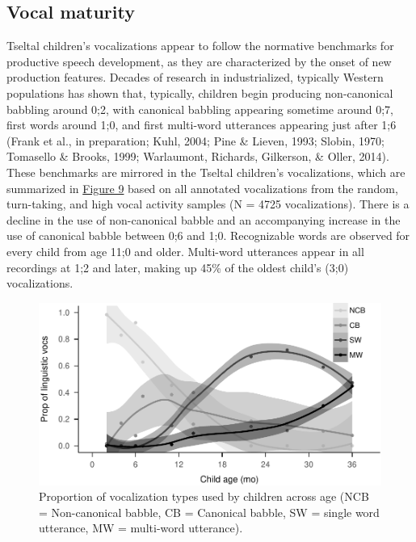 \documentclass[floatsintext,man]{apa6}
\theoremstyle{definition}
\theoremstyle{definition}
\theoremstyle{definition}
\theoremstyle{remark}
\begin{document}
\subsection{Vocal maturity}\label{vocal-maturity}

Tseltal children's vocalizations appear to follow the normative
benchmarks for productive speech development, as they are characterized
by the onset of new production features. Decades of research in
industrialized, typically Western populations has shown that, typically,
children begin producing non-canonical babbling around 0;2, with
canonical babbling appearing sometime around 0;7, first words around
1;0, and first multi-word utterances appearing just after 1;6 (Frank et
al., in preparation; Kuhl, 2004; Pine \& Lieven, 1993; Slobin, 1970;
Tomasello \& Brooks, 1999; Warlaumont, Richards, Gilkerson, \& Oller,
2014). These benchmarks are mirrored in the Tseltal children's
vocalizations, which are summarized in \protect\hyperlink{fig9}{Figure
9} based on all annotated vocalizations from the random, turn-taking,
and high vocal activity samples (N = 4725 vocalizations). There is a
decline in the use of non-canonical babble and an accompanying increase
in the use of canonical babble between 0;6 and 1;0. Recognizable words
are observed for every child from age 11;0 and older. Multi-word
utterances appear in all recordings at 1;2 and later, making up 45\% of
the oldest child's (3;0) vocalizations.

\begin{figure}
\centering
\includegraphics{Tseltal-CLE_files/figure-latex/fig9-1.pdf}
\caption{\label{fig:fig9}Proportion of vocalization types used by children
across age (NCB = Non-canonical babble, CB = Canonical babble, SW =
single word utterance, MW = multi-word utterance).}
\end{figure}
\end{document}
